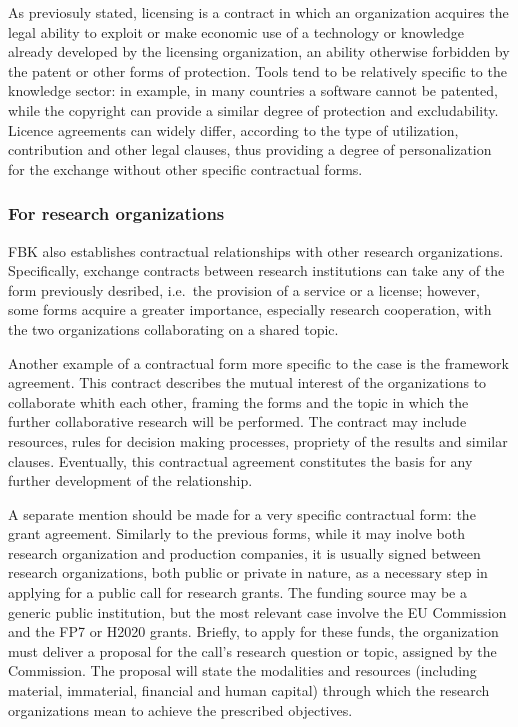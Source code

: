 As previosuly stated, licensing is a contract in which an organization acquires the legal ability to exploit or make economic use of a technology or knowledge already developed by the licensing organization, an ability otherwise forbidden by the patent or other forms of protection. Tools tend to be relatively specific to the knowledge sector: in example, in many countries a software cannot be patented, while the copyright can provide a similar degree of protection and excludability. Licence agreements can widely differ, according to the type of utilization, contribution and other legal clauses, thus providing a degree of personalization for the exchange without other specific contractual forms.

\subsubsection{For research organizations}

FBK also establishes contractual relationships with other research organizations. Specifically, exchange contracts between research institutions can take any of the form previously desribed, i.e.\ the provision of a service or a license; however, some forms acquire a greater importance, especially research cooperation, with the two organizations collaborating on a shared topic.

Another example of a contractual form more specific to the case is the framework agreement. This contract describes the mutual interest of the organizations to collaborate whith each other, framing the forms and the topic in which the further collaborative research will be performed. The contract may include resources, rules for decision making processes, propriety of the results and similar clauses. Eventually, this contractual agreement constitutes the basis for any further development of the relationship.

A separate mention should be made for a very specific contractual form: the grant agreement. Similarly to the previous forms, while it may inolve both research organization and production companies, it is usually signed between research organizations, both public or private in nature, as a necessary step in applying for a public call for research grants. The funding source may be a generic public institution, but the most relevant case involve the EU Commission and the FP7 or H2020 grants. Briefly, to apply for these funds, the organization must deliver a proposal for the call's research question or topic, assigned by the Commission. The proposal will state the modalities and resources (including material, immaterial, financial and human capital) through which the research organizations mean to achieve the prescribed objectives.

